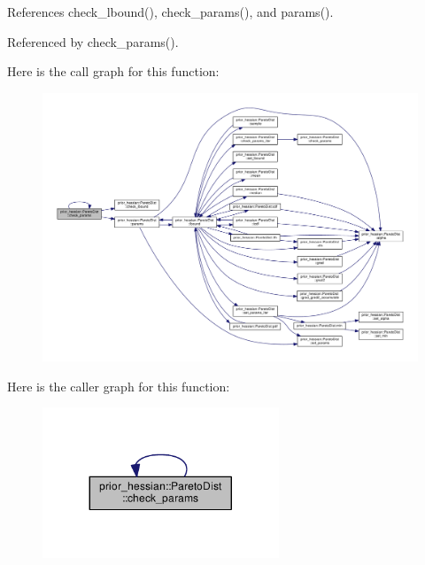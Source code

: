 References check\+\_\+lbound(), check\+\_\+params(), and params().



Referenced by check\+\_\+params().



Here is the call graph for this function\+:\nopagebreak
\begin{figure}[H]
\begin{center}
\leavevmode
\includegraphics[width=350pt]{classprior__hessian_1_1ParetoDist_ad90392cbacf44f0760b46e80a2676a08_cgraph}
\end{center}
\end{figure}




Here is the caller graph for this function\+:\nopagebreak
\begin{figure}[H]
\begin{center}
\leavevmode
\includegraphics[width=200pt]{classprior__hessian_1_1ParetoDist_ad90392cbacf44f0760b46e80a2676a08_icgraph}
\end{center}
\end{figure}



